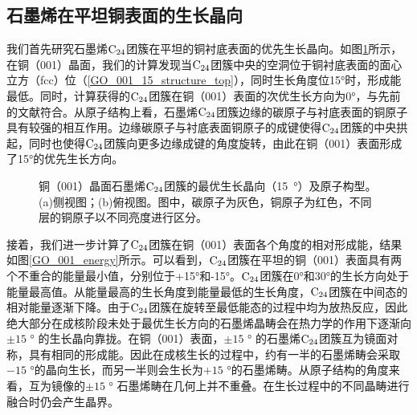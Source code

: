     \subsection{石墨烯在平坦铜表面的生长晶向}
        我们首先研究石墨烯$\rm{C_{24}}$团簇在平坦的铜衬底表面的优先生长晶向。如图\ref{GO_001_15_structure}所示，在铜（001）晶面，我们的计算发现当$\rm{C_{24}}$团簇中央的空洞位于铜衬底表面的面心立方（fcc）位（\ref{GO_001_15_structure_top}），同时生长角度位15\si{\degree}时，形成能最低。同时，计算获得的$\rm{C_{24}}$团簇在铜（001）表面的次优生长方向为0\si{\degree}，与先前的文献符合。从原子结构上看，石墨烯$\rm{C_{24}}$团簇边缘的碳原子与衬底表面的铜原子具有较强的相互作用。边缘碳原子与衬底表面铜原子的成键使得$\rm{C_{24}}$团簇的中央拱起，同时也使得$\rm{C_{24}}$团簇向更多边缘成键的角度旋转，由此在铜（001）表面形成了15\si{\degree}的优先生长方向。

        \begin{figure}[htbp]
            \caption{铜（001）晶面石墨烯$\rm{C_{24}}$团簇的最优生长晶向（\SI{15}{\degree}）及原子构型。(a)侧视图；(b)俯视图。图中，碳原子为灰色，铜原子为红色，不同层的铜原子以不同亮度进行区分。
            }
            \label{GO_001_15_structure}
        \end{figure}

        接着，我们进一步计算了$\rm{C_{24}}$团簇在铜（001）表面各个角度的相对形成能，结果如图\ref{GO_001_energy}所示。可以看到，$\rm{C_{24}}$团簇在平坦的铜（001）表面具有两个不重合的能量最小值，分别位于+15\si{\degree}和-15\si{\degree}。$\rm{C_{24}}$团簇在0\si{\degree}和30\si{\degree}的生长方向处于能量最高值。从能量最高的生长角度到能量最低的生长角度，$\rm{C_{24}}$团簇在中间态的相对能量逐渐下降。由于$\rm{C_{24}}$团簇在旋转至最低能态的过程中均为放热反应，因此绝大部分在成核阶段未处于最优生长方向的石墨烯晶畴会在热力学的作用下逐渐向$\pm 15$ \si{\degree} 的生长晶向靠拢。在铜（001）表面，$\pm 15$ \si{\degree} 的石墨烯$\rm{C_{24}}$团簇互为镜面对称，具有相同的形成能。因此在成核生长的过程中，约有一半的石墨烯畴会采取$-15$ \si{\degree}的晶向生长，而另一半则会生长为$+15$ \si{\degree}的石墨烯畴。从原子结构的角度来看，互为镜像的$\pm 15$ \si{\degree} 石墨烯畴在几何上并不重叠。在生长过程中的不同晶畴进行融合时仍会产生晶界。

